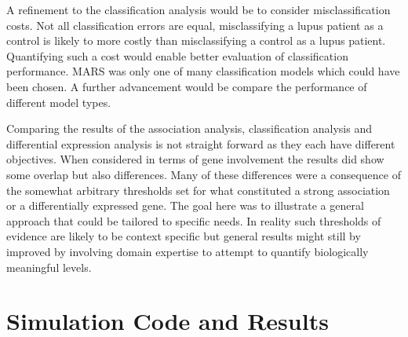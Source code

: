 \documentclass[a4paper, 12pt]{report}
\begin{document}
A refinement to the classification analysis would be to consider misclassification costs. Not all classification errors are equal, misclassifying a lupus patient as a control is likely to more costly than misclassifying a control as a lupus patient. Quantifying such a cost would enable better evaluation of classification performance. MARS was only one of many classification models which could have been chosen. A further advancement would be compare the performance of different model types.

Comparing the results of the association analysis, classification analysis and differential expression analysis is not straight forward as they each have different objectives. When considered in terms of gene involvement the results did show some overlap  but also differences. Many of these differences were a consequence of the somewhat arbitrary thresholds set for what constituted a strong association or a differentially expressed gene. The goal here was to illustrate a general approach that could be tailored to specific needs. In reality such thresholds of evidence are likely to be context specific but general results might still by improved by involving domain expertise to attempt to quantify biologically meaningful levels.




\printglossary

\appendix

\chapter{Simulation Code and Results}
\end{document}
